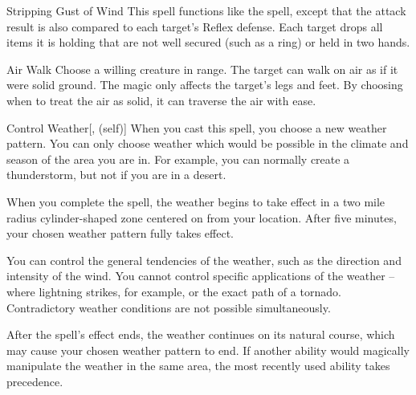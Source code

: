 \lowercase{\hypertarget{spell:Stripping Gust of Wind}{}}\label{spell:Stripping Gust of Wind}
\begin{ability}[\nth{3}]{\hypertarget{spell:Stripping Gust of Wind}{Stripping Gust of Wind}}
This spell functions like the  spell, except that the attack result is also compared to each target's Reflex defense.
\hit Each target drops all items it is holding that are not well secured (such as a ring) or held in two hands.
\end{ability}
\vspace{0.25em}



\lowercase{\hypertarget{spell:Air Walk}{}}\label{spell:Air Walk}
\begin{ability}[\nth{4}]{\hypertarget{spell:Air Walk}{Air Walk}}
Choose a willing creature in \rngclose range.
The target can walk on air as if it were solid ground.
The magic only affects the target's legs and feet.
By choosing when to treat the air as solid, it can traverse the air with ease.
\end{ability}
\vspace{0.25em}



\lowercase{\hypertarget{spell:Control Weather}{}}\label{spell:Control Weather}
\begin{ability}[\nth{4}]{\hypertarget{spell:Control Weather}{Control Weather}}[,  (self)]
When you cast this spell, you choose a new weather pattern.
You can only choose weather which would be possible in the climate and season of the area you are in.
For example, you can normally create a thunderstorm, but not if you are in a desert.

When you complete the spell, the weather begins to take effect in a two mile radius cylinder-shaped zone centered on from your location.
After five minutes, your chosen weather pattern fully takes effect.

You can control the general tendencies of the weather, such as the direction and intensity of the wind.
You cannot control specific applications of the weather -- where lightning strikes, for example, or the exact path of a tornado.
Contradictory weather conditions are not possible simultaneously.

After the spell's effect ends, the weather continues on its natural course, which may cause your chosen weather pattern to end.
If another ability would magically manipulate the weather in the same area, the most recently used ability takes precedence.
\end{ability}
\vspace{0.25em}



